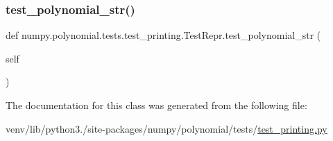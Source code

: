 \subsubsection{\texorpdfstring{test\+\_\+polynomial\+\_\+str()}{test\_polynomial\_str()}}
{\footnotesize\ttfamily def numpy.\+polynomial.\+tests.\+test\+\_\+printing.\+Test\+Repr.\+test\+\_\+polynomial\+\_\+str (\begin{DoxyParamCaption}\item[{}]{self }\end{DoxyParamCaption})}



The documentation for this class was generated from the following file\+:\begin{DoxyCompactItemize}
\item 
venv/lib/python3./site-\/packages/numpy/polynomial/tests/\hyperlink{test__printing_8py}{test\+\_\+printing.\+py}\end{DoxyCompactItemize}

